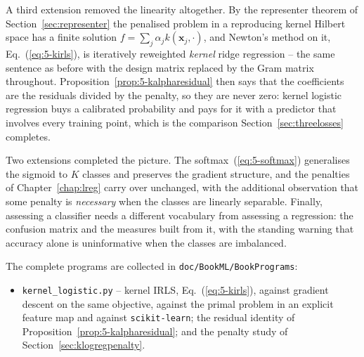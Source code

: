 A third extension removed the linearity altogether.  By the representer
theorem of Section~\ref{sec:representer} the penalised problem in a
reproducing kernel Hilbert space has a finite solution
$f=\sum_j\alpha_jk(\bm{x}_j,\cdot)$, and Newton's method on it,
Eq.~(\ref{eq:5-kirls}), is iteratively reweighted \emph{kernel} ridge
regression -- the same sentence as before with the design matrix replaced by
the Gram matrix throughout.  Proposition~\ref{prop:5-kalpharesidual} then says
that the coefficients are the residuals divided by the penalty, so they are
never zero: kernel logistic regression buys a calibrated probability and pays
for it with a predictor that involves every training point, which is the
comparison Section~\ref{sec:threelosses} completes.

Two extensions completed the picture.  The softmax~(\ref{eq:5-softmax})
generalises the sigmoid to $K$ classes and preserves the gradient structure,
and the penalties of Chapter~\ref{chap:lreg} carry over unchanged, with the
additional observation that some penalty is \emph{necessary} when the classes
are linearly separable.  Finally, assessing a classifier needs a different
vocabulary from assessing a regression: the confusion matrix and the measures
built from it, with the standing warning that accuracy alone is uninformative
when the classes are imbalanced.

The complete programs are collected in \texttt{doc/BookML/BookPrograms}:

\begin{itemize}
  \item \texttt{kernel\_logistic.py} -- kernel IRLS, Eq.~(\ref{eq:5-kirls}),
        against gradient descent on the same objective, against the primal
        problem in an explicit feature map and against \texttt{scikit-learn};
        the residual identity of
        Proposition~\ref{prop:5-kalpharesidual}; and the penalty study of
        Section~\ref{sec:klogregpenalty}.
\end{itemize}


